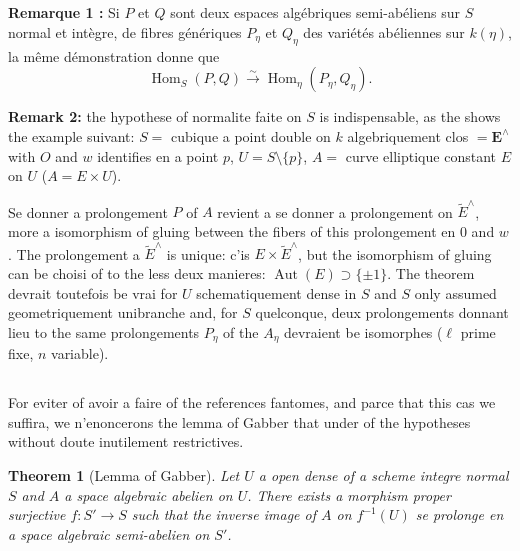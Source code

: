 \documentclass[12pt,a4paper]{article}
\theoremstyle{plain}
\newtheorem{theorem}{Theorem}[section]
\theoremstyle{definition}
\theoremstyle{remark}
\DeclareMathOperator{\Aut}{Aut}
\DeclareMathOperator{\Hom}{Hom}
\begin{document}
\subsection{}

\textbf{Remarque 1 :} Si $P$ et $Q$ sont deux espaces algébriques semi-abéliens sur $S$ normal et intègre, de fibres génériques $P_\eta$ et $Q_\eta$ des variétés abéliennes sur $k(\eta)$, la même démonstration donne que
\[
\Hom_S(P,Q) \xrightarrow{\sim} \Hom_\eta(P_\eta, Q_\eta).
\]

\textbf{Remark 2:} the hypothese of normalite faite on $S$ is indispensable, as the shows the example suivant: $S =$ cubique a point double on $k$ algebriquement clos $= \mathbf{E}^\wedge$ with $O$ and $w$ identifies en a point $p$, $U = S \setminus \{p\}$, $A =$ curve elliptique constant $E$ on $U$ ($A = E \times U$).

Se donner a prolongement $P$ of $A$ revient a se donner a prolongement on $\widetilde{E}^\wedge$, more a isomorphism of gluing between the fibers of this prolongement en $0$ and $w$. The prolongement a $\widetilde{E}^\wedge$ is unique: c'is $E \times \widetilde{E}^\wedge$, but the isomorphism of gluing can be choisi of to the less deux manieres: $\Aut(E) \supset \{\pm 1\}$. The theorem devrait toutefois be vrai for $U$ schematiquement dense in $S$ and $S$ only assumed geometriquement unibranche and, for $S$ quelconque, deux prolongements donnant lieu to the same prolongements $P_\eta$ of the $A_\eta$ devraient be isomorphes ($\ell$ prime fixe, $n$ variable).

\subsection{} For eviter of avoir a faire of the references fantomes, and parce that this cas we suffira, we n'enoncerons the lemma of Gabber that under of the hypotheses without doute inutilement restrictives.

\begin{theorem}[Lemma of Gabber]
Let $U$ a open dense of a scheme integre normal $S$ and $A$ a space algebraic abelien on $U$. There exists a morphism proper surjective $f : S' \to S$ such that the inverse image of $A$ on $f^{-1}(U)$ se prolonge en a space algebraic semi-abelien on $S'$.
\end{theorem}
\end{document}
